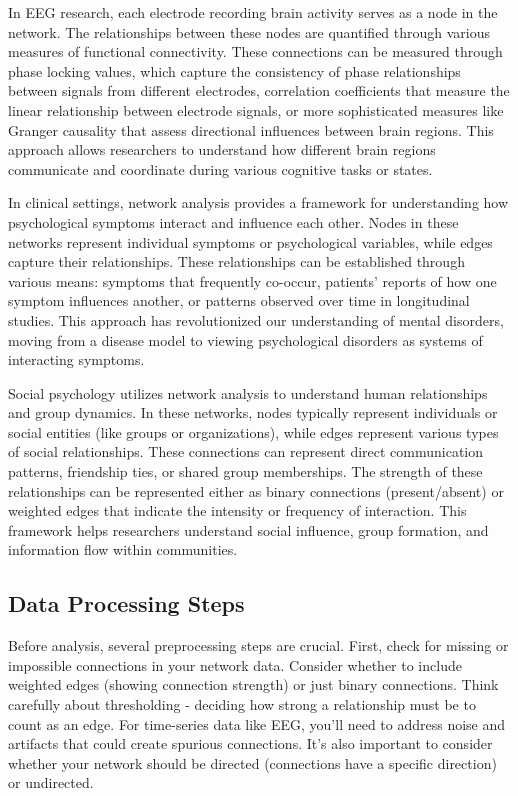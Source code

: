 In EEG research, each electrode recording brain activity serves as a node in the network. The relationships between these nodes are quantified through various measures of functional connectivity. These connections can be measured through phase locking values, which capture the consistency of phase relationships between signals from different electrodes, correlation coefficients that measure the linear relationship between electrode signals, or more sophisticated measures like Granger causality that assess directional influences between brain regions. This approach allows researchers to understand how different brain regions communicate and coordinate during various cognitive tasks or states.

In clinical settings, network analysis provides a framework for understanding how psychological symptoms interact and influence each other. Nodes in these networks represent individual symptoms or psychological variables, while edges capture their relationships. These relationships can be established through various means: symptoms that frequently co-occur, patients' reports of how one symptom influences another, or patterns observed over time in longitudinal studies. This approach has revolutionized our understanding of mental disorders, moving from a disease model to viewing psychological disorders as systems of interacting symptoms.

Social psychology utilizes network analysis to understand human relationships and group dynamics. In these networks, nodes typically represent individuals or social entities (like groups or organizations), while edges represent various types of social relationships. These connections can represent direct communication patterns, friendship ties, or shared group memberships. The strength of these relationships can be represented either as binary connections (present/absent) or weighted edges that indicate the intensity or frequency of interaction. This framework helps researchers understand social influence, group formation, and information flow within communities.

\subsection*{Data Processing Steps}
Before analysis, several preprocessing steps are crucial. First, check for missing or impossible connections in your network data. Consider whether to include weighted edges (showing connection strength) or just binary connections. Think carefully about thresholding - deciding how strong a relationship must be to count as an edge. For time-series data like EEG, you'll need to address noise and artifacts that could create spurious connections. It's also important to consider whether your network should be directed (connections have a specific direction) or undirected.

